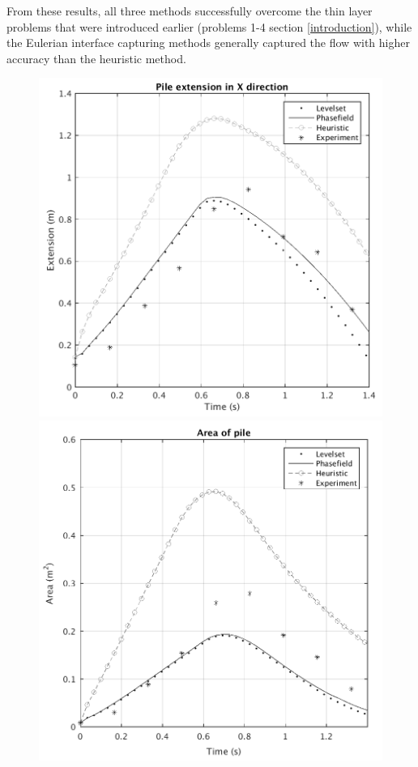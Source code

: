\documentclass[review]{elsarticle}
\begin{document}
From these results, all three methods successfully overcome the thin layer problems that were introduced earlier (problems 1-4 section \ref{introduction}), 
while the Eulerian interface capturing methods generally captured the flow with higher accuracy than the heuristic method.
\begin{figure}[H]
        \begin{minipage}[b]{.5\textwidth}
                \centering
                \includegraphics[width=1\textwidth]{IMAGES/xextend.png}
                  \label{x_extent}
                \includegraphics[width=1\textwidth]{IMAGES/area.png}

\end{minipage}
\end{figure}
\end{document}
